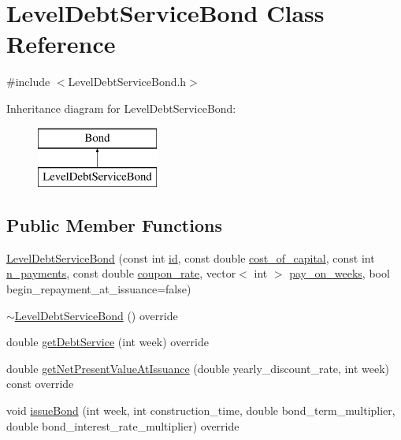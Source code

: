 \hypertarget{classLevelDebtServiceBond}{}\section{Level\+Debt\+Service\+Bond Class Reference}
\label{classLevelDebtServiceBond}


{\ttfamily \#include $<$Level\+Debt\+Service\+Bond.\+h$>$}

Inheritance diagram for Level\+Debt\+Service\+Bond\+:\begin{figure}[H]
\begin{center}
\leavevmode
\includegraphics[height=2.000000cm]{classLevelDebtServiceBond}
\end{center}
\end{figure}
\subsection*{Public Member Functions}
\begin{DoxyCompactItemize}
\item 
\mbox{\hyperlink{classLevelDebtServiceBond_a71af87d057090bd2310a10df03b36fdf}{Level\+Debt\+Service\+Bond}} (const int \mbox{\hyperlink{classBond_a7f75bcafbc16676ad6dbafbf40afae4a}{id}}, const double \mbox{\hyperlink{classBond_ad98df7d28b398e620286f95ee085439b}{cost\+\_\+of\+\_\+capital}}, const int \mbox{\hyperlink{classBond_a4a227b6de2eeada118d82ab1633b1db8}{n\+\_\+payments}}, const double \mbox{\hyperlink{classBond_a5f66785534e24caa43d9f730130a6463}{coupon\+\_\+rate}}, vector$<$ int $>$ \mbox{\hyperlink{classBond_ae8dd46fcbf95c993460ffe4ea1f52739}{pay\+\_\+on\+\_\+weeks}}, bool begin\+\_\+repayment\+\_\+at\+\_\+issuance=false)
\item 
\mbox{\hyperlink{classLevelDebtServiceBond_a6327829c1f1e6941cc22cea371cf024a}{$\sim$\+Level\+Debt\+Service\+Bond}} () override
\item 
double \mbox{\hyperlink{classLevelDebtServiceBond_adcb3bd3c34b0cbb7b013f387ddd8b7f5}{get\+Debt\+Service}} (int week) override
\item 
double \mbox{\hyperlink{classLevelDebtServiceBond_a0f5820c3e76b8b908dbe153a8291d96a}{get\+Net\+Present\+Value\+At\+Issuance}} (double yearly\+\_\+discount\+\_\+rate, int week) const override
\item 
void \mbox{\hyperlink{classLevelDebtServiceBond_a51a54a1a25be105b168bf86489aee417}{issue\+Bond}} (int week, int construction\+\_\+time, double bond\+\_\+term\+\_\+multiplier, double bond\+\_\+interest\+\_\+rate\+\_\+multiplier) override
\end{DoxyCompactItemize}
